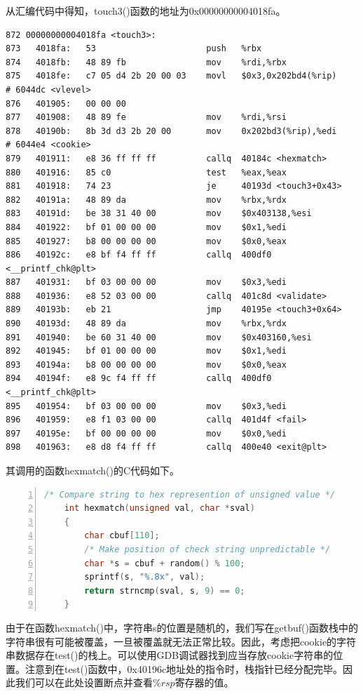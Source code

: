 \documentclass{article}
\begin{document}
从汇编代码中得知，touch3()函数的地址为0x00000000004018fa。

\begin{lstlisting}[title = touch3()函数反汇编代码, xleftmargin = 4em,xrightmargin = 4em, aboveskip = 1em, numbers = none]
872 00000000004018fa <touch3>:
873   4018fa:   53                      push   %rbx
874   4018fb:   48 89 fb                mov    %rdi,%rbx
875   4018fe:   c7 05 d4 2b 20 00 03    movl   $0x3,0x202bd4(%rip)        # 6044dc <vlevel>
876   401905:   00 00 00
877   401908:   48 89 fe                mov    %rdi,%rsi
878   40190b:   8b 3d d3 2b 20 00       mov    0x202bd3(%rip),%edi        # 6044e4 <cookie>
879   401911:   e8 36 ff ff ff          callq  40184c <hexmatch>
880   401916:   85 c0                   test   %eax,%eax
881   401918:   74 23                   je     40193d <touch3+0x43>
882   40191a:   48 89 da                mov    %rbx,%rdx
883   40191d:   be 38 31 40 00          mov    $0x403138,%esi
884   401922:   bf 01 00 00 00          mov    $0x1,%edi
885   401927:   b8 00 00 00 00          mov    $0x0,%eax
886   40192c:   e8 bf f4 ff ff          callq  400df0 <__printf_chk@plt>
887   401931:   bf 03 00 00 00          mov    $0x3,%edi
888   401936:   e8 52 03 00 00          callq  401c8d <validate>
889   40193b:   eb 21                   jmp    40195e <touch3+0x64>
890   40193d:   48 89 da                mov    %rbx,%rdx
891   401940:   be 60 31 40 00          mov    $0x403160,%esi
892   401945:   bf 01 00 00 00          mov    $0x1,%edi
893   40194a:   b8 00 00 00 00          mov    $0x0,%eax
894   40194f:   e8 9c f4 ff ff          callq  400df0 <__printf_chk@plt>
895   401954:   bf 03 00 00 00          mov    $0x3,%edi
896   401959:   e8 f1 03 00 00          callq  401d4f <fail>
897   40195e:   bf 00 00 00 00          mov    $0x0,%edi
898   401963:   e8 d8 f4 ff ff          callq  400e40 <exit@plt>
\end{lstlisting}
其调用的函数hexmatch()的C代码如下。
\begin{lstlisting}[title = 函数hexmatch()的C代码, xleftmargin = 4em,xrightmargin = 4em, aboveskip = 1em, numbers = left, language = C]
    /* Compare string to hex represention of unsigned value */
    int hexmatch(unsigned val, char *sval)
    {
        char cbuf[110];
        /* Make position of check string unpredictable */
        char *s = cbuf + random() % 100;
        sprintf(s, "%.8x", val);
        return strncmp(sval, s, 9) == 0;
    }
\end{lstlisting}

由于在函数hexmatch()中，字符串s的位置是随机的，我们写在getbuf()函数栈中的字符串很有可能被覆盖，一旦被覆盖就无法正常比较。因此，考虑把cookie的字符串数据存在test()的栈上。可以使用GDB调试器找到应当存放cookie字符串的位置。注意到在test()函数中，0x40196c地址处的指令时，栈指针已经分配完毕。因此我们可以在此处设置断点并查看$\%rsp$寄存器的值。
\end{document}
